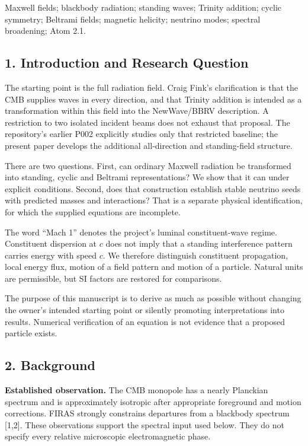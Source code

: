 \documentclass[
  11pt,
]{article}
\begin{document}
Maxwell fields; blackbody radiation; standing waves; Trinity addition;
cyclic symmetry; Beltrami fields; magnetic helicity; neutrino modes;
spectral broadening; Atom 2.1.

\hypertarget{introduction-and-research-question}{%
\subsection{1. Introduction and Research
Question}\label{introduction-and-research-question}}

The starting point is the full radiation field. Craig Fink's
clarification is that the CMB supplies waves in every direction, and
that Trinity addition is intended as a transformation within this field
into the NewWave/BBRV description. A restriction to two isolated
incident beams does not exhaust that proposal. The repository's earlier
P002 explicitly studies only that restricted baseline; the present paper
develops the additional all-direction and standing-field structure.

There are two questions. First, can ordinary Maxwell radiation be
transformed into standing, cyclic and Beltrami representations? We show
that it can under explicit conditions. Second, does that construction
establish stable neutrino seeds with predicted masses and interactions?
That is a separate physical identification, for which the supplied
equations are incomplete.

The word ``Mach 1'' denotes the project's luminal constituent-wave
regime. Constituent dispersion at \(c\) does not imply that a standing
interference pattern carries energy with speed \(c\). We therefore
distinguish constituent propagation, local energy flux, motion of a
field pattern and motion of a particle. Natural units are permissible,
but SI factors are restored for comparisons.

The purpose of this manuscript is to derive as much as possible without
changing the owner's intended starting point or silently promoting
interpretations into results. Numerical verification of an equation is
not evidence that a proposed particle exists.

\hypertarget{background}{%
\subsection{2. Background}\label{background}}

\textbf{Established observation.} The CMB monopole has a nearly
Planckian spectrum and is approximately isotropic after appropriate
foreground and motion corrections. FIRAS strongly constrains departures
from a blackbody spectrum {[}1,2{]}. These observations support the
spectral input used below. They do not specify every relative
microscopic electromagnetic phase.
\end{document}
